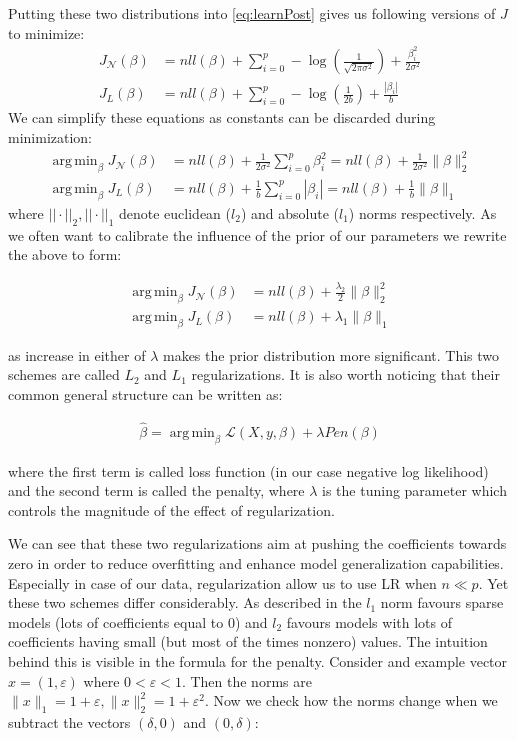 \documentclass[shortabstract, english, mgr]{iithesis}
\DeclareMathOperator*{\argmin}{arg\,min}
\begin{document}
Putting these two distributions into \ref{eq:learnPost} gives us following versions of $J$ to minimize:
\begin{align*}
    J_{\mathcal{N}}(\beta) &= nll(\beta) + \sum_{i=0}^p -\log \left(\frac{1}{\sqrt{2 \pi \sigma^{2}}} \right) + \frac{\beta_i^{2}}{2 \sigma^{2}} \\
    J_{L}(\beta) &= nll(\beta) + \sum_{i=0}^p -\log \left(\frac{1}{2 b} \right) + \frac{|\beta_i|}{b}
\end{align*}
We can simplify these equations as constants can be discarded during minimization:
\begin{align*}
    \argmin_{\beta} J_{\mathcal{N}}(\beta) &= nll(\beta) + \frac{1}{2 \sigma^2}\sum_{i=0}^p \beta_i^{2} = nll(\beta) + \frac{1}{2 \sigma^2}\| \beta \|_2^2\\ 
    \argmin_{\beta} J_{L}(\beta) &= nll(\beta) + \frac{1}{b}\sum_{i=0}^p |\beta_i| = nll(\beta) + \frac{1}{b}\| \beta\|_1 
\end{align*}
where $||\cdot||_2, ||\cdot||_1$ denote euclidean ($l_2$) and absolute ($l_1$) norms respectively. As we often want to calibrate the influence of the prior of our parameters we rewrite the above to form: 

\begin{align*}
    \argmin_{\beta} J_{\mathcal{N}}(\beta) &=  nll(\beta) + \frac{\lambda_2}{2}\| \beta \|_2^2\\ 
    \argmin_{\beta} J_{L}(\beta) &= nll(\beta) + \lambda_1\| \beta\|_1 
\end{align*}

as increase in either of $\lambda$ makes the prior distribution more significant. This two schemes are called $L_2$ and $L_1$ regularizations. It is also worth noticing that their common general structure can be written as:

\begin{align}
    \hat{\beta} = \argmin_{\beta} \mathcal{L}(X,y, \beta) + \lambda Pen(\beta) \label{eq:loss+pen}
\end{align}

where the first term is called loss function (in our case negative log likelihood) and the second term is called the penalty, where $\lambda$ is the tuning parameter which controls the magnitude of the effect of regularization.

We can see that these two regularizations aim at pushing the coefficients towards zero in order to reduce overfitting and enhance model generalization capabilities. Especially in case of our data, regularization allow us to use LR when $n \ll p$. Yet these two schemes differ considerably. As described in \cite[chapter 13.3.1]{MLprob} the $l_1$ norm favours sparse models (lots of coefficients equal to $0$) and $l_2$ favours models with lots of coefficients having small (but most of the times nonzero) values. The intuition behind this is visible in the formula for the penalty. Consider and example vector $x = (1, \varepsilon)$ where $0 < \varepsilon < 1$. Then the norms are $\|x\|_{1}=1+\varepsilon,  \|x\|_{2}^{2}=1+\varepsilon^{2}$. Now we check how the norms change when we subtract the vectors $(\delta, 0)$ and $(0, \delta)$:
\end{document}
